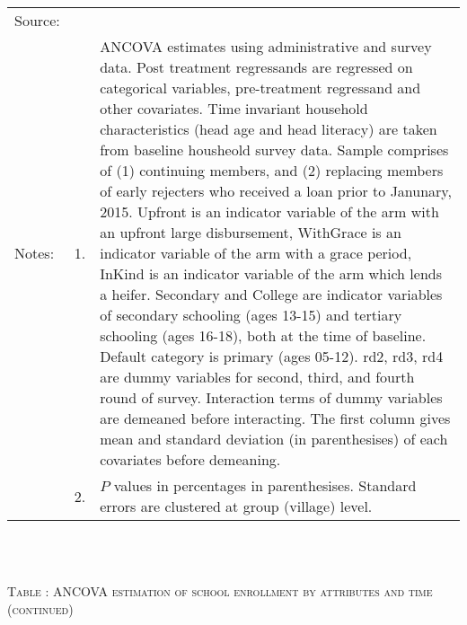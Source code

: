 \begin{minipage}[t]{14cm}
\begin{tabular}{>{\hfill\scriptsize}p{1cm}<{}>{\hfill\scriptsize}p{.25cm}<{}>{\scriptsize}p{12cm}<{\hfill}}
Source:& \multicolumn{2}{l}{\scriptsize Estimated with GUK administrative and survey data.}\\
Notes: & 1. & ANCOVA estimates using administrative and survey data. Post treatment regressands are regressed on categorical variables, pre-treatment regressand and other covariates. Time invariant household characteristics (head age and head literacy) are taken from baseline housheold survey data. Sample comprises of (1) continuing members, and (2) replacing members of early rejecters who received a loan prior to Janunary, 2015.  \textsf{Upfront} is an indicator variable of the arm with an upfront large disbursement, \textsf{WithGrace} is an indicator variable of the arm with a grace period, \textsf{InKind} is an indicator variable of the arm which lends a heifer. \textsf{Secondary} and \textsf{College} are indicator variables of secondary schooling (ages 13-15) and tertiary schooling (ages 16-18), both at the time of baseline. Default category is primary (ages 05-12). \textsf{rd2, rd3, rd4} are dummy variables for second, third, and fourth round of survey. Interaction terms of dummy variables are demeaned before interacting. The first column gives mean and standard deviation (in parenthesises) of each covariates before demeaning. \\
& 2. & $P$ values in percentages in parenthesises. Standard errors are clustered at group (village) level. %
 \end{tabular}
\end{minipage} \\\\\hspace{-1cm}\begin{minipage}[t]{14cm} \hfil\textsc{\normalsize Table \thetable: ANCOVA estimation of school enrollment by attributes and time (continued)\label{tab ANCOVA enroll time varying attributes2}}\\ \setlength{\tabcolsep}{1pt}
  \setlength{\baselineskip}{8pt}
  \renewcommand{\arraystretch}{.55}
  \hfil{}\\
\renewcommand{\arraystretch}{.8}

\end{minipage}
